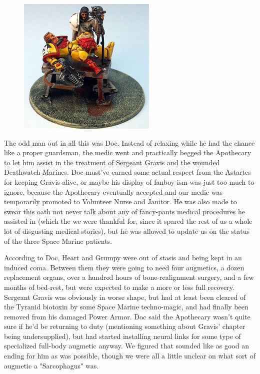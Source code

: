 \begin{figure}
	\begin{center}
		\includegraphics[width=\figwidth]{pics/17/27.png}
	\end{center}
\end{figure}
The odd man out in all this was Doc. 
Instead of relaxing while he had the chance like a proper guardsman, the medic went and practically begged the Apothecary to let him assist in the treatment of Sergeant Gravis and the wounded Deathwatch Marines. 
Doc must've earned some actual respect from the Astartes for keeping Gravis alive, or maybe his display of fanboy-ism was just too much to ignore, because the Apothecary eventually accepted and our medic was temporarily promoted to Volunteer Nurse and Janitor. 
He was also made to swear this oath not never talk about any of fancy-pants medical procedures he assisted in (which the we were thankful for, since it spared the rest of us a whole lot of disgusting medical stories), but he was allowed to update us on the status of the three Space Marine patients.

According to Doc, Heart and Grumpy were out of stasis and being kept in an induced coma. 
Between them they were going to need four augmetics, a dozen replacement organs, over a hundred hours of bone-realignment surgery, and a few months of bed-rest, but were expected to make a more or less full recovery. 
Sergeant Gravis was obviously in worse shape, but had at least been cleared of the Tyranid biotoxin by some Space Marine techno-magic, and had finally been removed from his damaged Power Armor. 
Doc said the Apothecary wasn't quite sure if he'd be returning to duty (mentioning something about Gravis' chapter being undersupplied), but had started installing neural links for some type of specialized full-body augmetic anyway. 
We figured that sounded like as good an ending for him as was possible, though we were all a little unclear on what sort of augmetic a "Sarcophagus" was.

